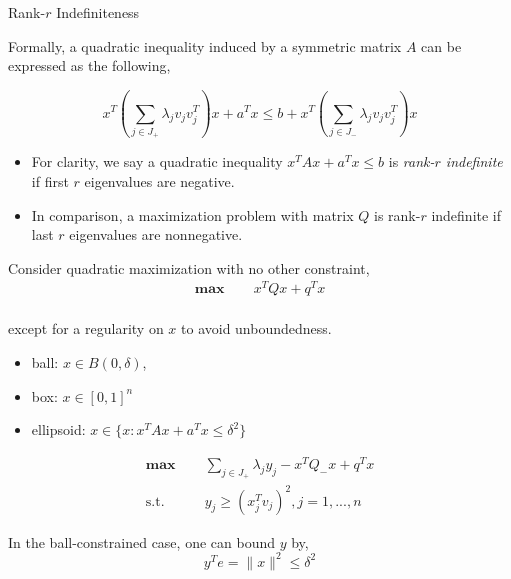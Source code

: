 \documentclass[aspectratio=1610, 9pt]{beamer}
\newcommand{\mx}{\mathbf{\max}\;}
\newcommand{\st}{\mathrm{s.t.\;}}
\begin{document}
\begin{frame}[allowframebreaks]{Rank-\(r\) Indefiniteness}

  Formally, a quadratic inequality induced by a symmetric matrix \(A\) can be expressed as the following,

  \begin{equation}
    x^T \left(\sum_{j\in J_+} \lambda_j v_jv_j^T\right)x +a^Tx \le b + x^T\left(\sum_{j\in J_-} \lambda_j v_jv_j^T\right)x
  \end{equation}

  \begin{itemize}
    \item For clarity, we say a quadratic inequality \(x^TAx + a^Tx \le b\) is \emph{rank-\(r\) indefinite} if first \(r\) eigenvalues are negative.
    \item In comparison, a maximization problem with matrix \(Q\) is rank-\(r\) indefinite if last \(r\) eigenvalues are nonnegative.
  \end{itemize}

  \framebreak

  Consider quadratic maximization with no other constraint,
  \begin{equation}
    \begin{aligned}
      \mx \quad & x^TQx + q^Tx \\
    \end{aligned}
  \end{equation}

  except for a regularity on \(x\) to avoid unboundedness.
  \begin{itemize}
    \item ball: \(x\in B(0, \delta)\),
    \item box: \(x\in [0, 1]^n\)
    \item ellipsoid: \(x \in \{x: x^TAx + a^Tx \le \delta^2\}\)
  \end{itemize}

  \begin{equation}\label{eq:qp_unc_rr_conic}
    \begin{aligned}
      \mx \quad & \sum_{j\in J_+} \lambda_j y_j - x^TQ_-x  + q^Tx \\
      \st \quad & y_j \ge (x_j^T v_j)^2, j= 1, ..., n
    \end{aligned}
  \end{equation}

  In the ball-constrained case, one can bound \(y\) by,
  \begin{equation}
    y^Te = \|x\|^2 \le \delta^2
  \end{equation}
\end{frame}
\end{document}
